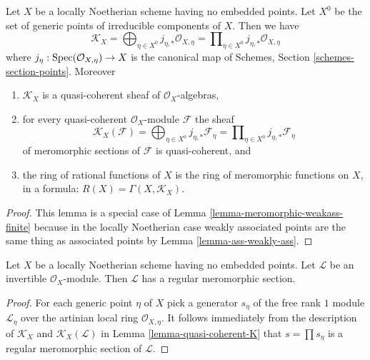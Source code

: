 \begin{lemma}
\label{lemma-quasi-coherent-K}
Let $X$ be a locally Noetherian scheme having no embedded points.
Let $X^0$ be the set of generic points of irreducible components of $X$.
Then we have
$$
\mathcal{K}_X =
\bigoplus\nolimits_{\eta \in X^0} j_{\eta, *}\mathcal{O}_{X, \eta} =
\prod\nolimits_{\eta \in X^0} j_{\eta, *}\mathcal{O}_{X, \eta}
$$
where $j_\eta : \mathop{\mathrm{Spec}}(\mathcal{O}_{X, \eta}) \to X$ is the canonical map
of Schemes, Section \ref{schemes-section-points}. Moreover
\begin{enumerate}
\item $\mathcal{K}_X$ is a quasi-coherent sheaf of $\mathcal{O}_X$-algebras,
\item for every quasi-coherent $\mathcal{O}_X$-module $\mathcal{F}$ the sheaf
$$
\mathcal{K}_X(\mathcal{F}) =
\bigoplus\nolimits_{\eta \in X^0} j_{\eta, *}\mathcal{F}_\eta =
\prod\nolimits_{\eta \in X^0} j_{\eta, *}\mathcal{F}_\eta
$$
of meromorphic sections of $\mathcal{F}$ is quasi-coherent, and
\item the ring of rational functions of $X$ is the ring of meromorphic
functions on $X$, in a formula: $R(X) = \Gamma(X, \mathcal{K}_X)$.
\end{enumerate}
\end{lemma}

\begin{proof}
This lemma is a special case of
Lemma \ref{lemma-meromorphic-weakass-finite}
because in the locally Noetherian case
weakly associated points are the same thing
as associated points by Lemma \ref{lemma-ass-weakly-ass}.
\end{proof}

\begin{lemma}
\label{lemma-regular-meromorphic-section-exists-noetherian}
Let $X$ be a locally Noetherian scheme having no embedded points.
Let $\mathcal{L}$ be an invertible $\mathcal{O}_X$-module.
Then $\mathcal{L}$ has a regular meromorphic section.
\end{lemma}

\begin{proof}
For each generic point $\eta$ of $X$ pick a generator
$s_\eta$ of the free rank $1$ module $\mathcal{L}_\eta$
over the artinian local ring $\mathcal{O}_{X, \eta}$.
It follows immediately from the description of
$\mathcal{K}_X$ and $\mathcal{K}_X(\mathcal{L})$ in
Lemma \ref{lemma-quasi-coherent-K} that $s = \prod s_\eta$
is a regular meromorphic section of $\mathcal{L}$.
\end{proof}

